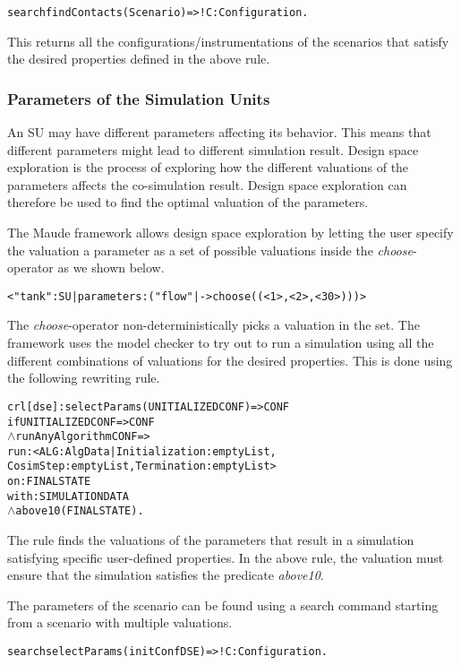 \begin{alltt}
  \small
  search findContacts(Scenario) =>! C:Configuration .
\end{alltt}
  
This returns all the configurations/instrumentations of the scenarios that satisfy the desired properties defined in the above rule.

\subsubsection{Parameters of the Simulation Units}
An SU may have different parameters affecting its behavior.
This means that different parameters might lead to different simulation result.
Design space exploration is the process of exploring how the different valuations of the parameters affects the co-simulation result.
Design space exploration can therefore be used to find the optimal valuation of the parameters. 

The Maude framework allows design space exploration by letting the user specify the valuation a parameter as a set of possible valuations inside the \emph{choose}-operator as we shown below.
\begin{alltt}
  \small
< "tank" : SU | parameters : ("flow" |-> choose((< 1 >,< 2 >,< 30 >))) >
\end{alltt}

The \emph{choose}-operator non-deterministically picks a valuation in the set.
The framework uses the model checker to try out to run a simulation using all the different combinations of valuations for the desired properties.
This is done using the following rewriting rule.

\begin{alltt}
  \small
  crl [dse] : selectParams(UNITIALIZEDCONF) => CONF 
  if UNITIALIZEDCONF => CONF
  \(\land\) runAnyAlgorithm CONF => 
      run: < ALG : AlgData | Initialization : emptyList, 
      CosimStep : emptyList, Termination : emptyList > 
      on: FINALSTATE
      with: SIMULATIONDATA
  \(\land\) above10(FINALSTATE) .
\end{alltt}

The rule finds the valuations of the parameters that result in a simulation satisfying specific user-defined properties.
In the above rule, the valuation must ensure that the simulation satisfies the predicate \emph{above10}.

The parameters of the scenario can be found using a search command starting from a scenario with multiple valuations.
\begin{alltt}
  \small
  search selectParams(initConfDSE)  =>! C:Configuration .
\end{alltt}

